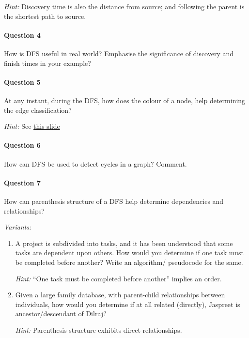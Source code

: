\documentclass[11pt]{article}
\begin{document}
\emph{Hint:} Discovery time is also the distance from
source; and following the parent is the shortest path
to source.

\paragraph*{Question 4}
\label{sec:org7ffd991}

How is DFS useful in real world?  Emphasise the
significance of discovery and finish times in your
example?

\paragraph*{Question 5}
\label{sec:org9cbaaad}

At any instant, during the DFS, how does the colour of
a node, help determining the edge classification?

\emph{Hint:} See \href{https://docs.google.com/presentation/d/14PY-Sc50QsFxdUqZk7GlYVwwEXzO38rg9z9KKx5ti0k/edit\#slide=id.g32a7028b731\_0\_422}{this slide}

\paragraph*{Question 6}
\label{sec:orgdf69cab}

How can DFS be used to detect cycles in a graph?
Comment.

\paragraph*{Question 7}
\label{sec:org48f1b74}

How can parenthesis structure of a DFS help determine
dependencies and relationships?

\emph{Variants:}

\begin{enumerate}
\item A project is subdivided into tasks, and it has been
understood that some tasks are dependent upon
others.  How would you determine if one task must be
completed before another?  Write an algorithm/
pseudocode for the same.

\emph{Hint:} ``One task must be completed before another''
implies an order.

\item Given a large family database, with parent-child
relationships between individuals, how would you
determine if at all related (directly), Jaspreet is
ancestor/descendant of Dilraj?

\emph{Hint:} Parenthesis structure exhibits direct
relationships.
\end{enumerate}
\end{document}
